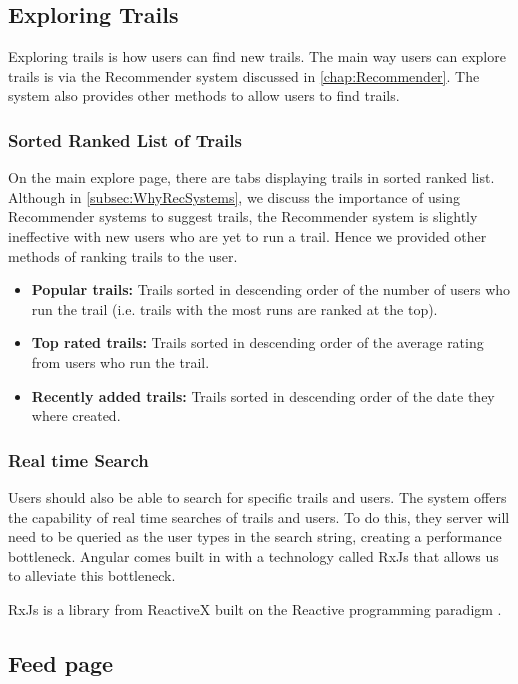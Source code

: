 \subsection{Exploring Trails}
Exploring trails is how users can find new trails. The main way users can explore trails is via the Recommender system discussed in \autoref{chap:Recommender}. The system also provides other methods to allow users to find trails.

\subsubsection{Sorted Ranked List of Trails}
On the main explore page, there are tabs displaying trails in sorted ranked list. Although in \autoref{subsec:WhyRecSystems}, we discuss the importance of using Recommender systems to suggest trails, the Recommender system is slightly ineffective with new users who are yet to run a trail. Hence we provided other methods of ranking trails to the user.

\begin{itemize}
    \item \textbf{Popular trails:} Trails sorted in descending order of the number of users who run the trail (i.e. trails with the most runs are ranked at the top). 
    \item \textbf{Top rated trails:} Trails sorted in descending order of the average rating from users who run the trail.
    \item \textbf{Recently added trails:} Trails sorted in descending order of the date they where created.
\end{itemize}

\subsubsection{Real time Search}
Users should also be able to search for specific trails and users. The system offers the capability of real time searches of trails and users. To do this, they server will need to be queried as the user types in the search string, creating a performance bottleneck. Angular comes built in with a technology called RxJs that allows us to alleviate this bottleneck.

RxJs is a library from ReactiveX built on the Reactive programming paradigm \cite{wan2000functional}.

\subsection{Feed page}

